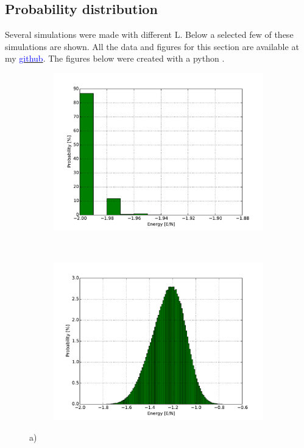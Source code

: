 \pagebreak
\subsection{Probability distribution}

Several simulations were made with different L. Below a selected few of these simulations are shown. All the data and figures for this section are available at my \href{https://github.com/erikfsk/Project-4/tree/master/Project4/Result/4d/}{\textcolor{blue}{github}}. The figures below were created with a python \href{https://github.com/erikfsk/Project-4/blob/master/Project4/Result/4d/plot-hist.py}{\color{blue}{script}}.

\begin{figure}[H]
    \centering
    \begin{subfigure}{0.5\textwidth}
        \centering
        \includegraphics[width=\linewidth]{result/bilder/hist/MC1000000T1-distN20-hist}
        \caption{}
    \end{subfigure}%
    ~ 
    \begin{subfigure}{0.5\textwidth}
        \centering
        \includegraphics[width=\linewidth]{result/bilder/hist/MC1000000T24-distN20-hist}
        \caption{}
    \end{subfigure}
    \caption{a) }
    \label{fig:tc-chi-cv}
\end{figure}
